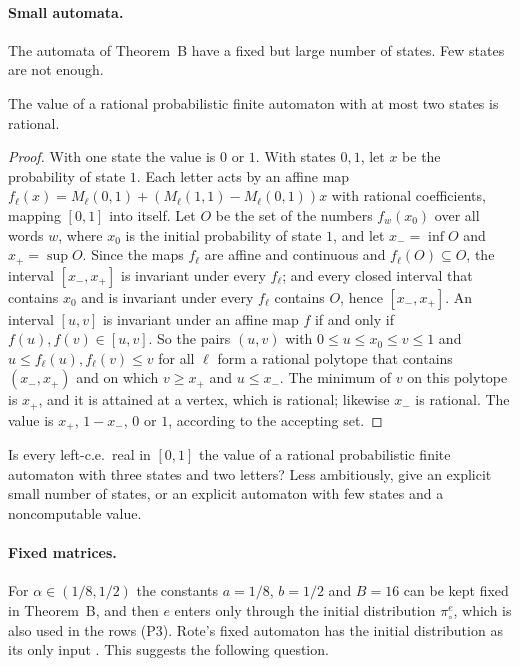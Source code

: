 \documentclass[11pt]{article}
\theoremstyle{plain}
\theoremstyle{definition}
\theoremstyle{remark}
\begin{document}
\paragraph{Small automata.} The automata of Theorem~B have a fixed but large number of states. Few states are not enough.

\begin{proposition}\label{prop:two}
The value of a rational probabilistic finite automaton with at most two states is rational.
\end{proposition}

\begin{proof}
With one state the value is $0$ or $1$. With states $0,1$, let $x$ be the probability of state $1$. Each letter acts by an affine map $f_\ell(x)=M_\ell(0,1)+(M_\ell(1,1)-M_\ell(0,1))x$ with rational coefficients, mapping $[0,1]$ into itself. Let $O$ be the set of the numbers $f_w(x_0)$ over all words $w$, where $x_0$ is the initial probability of state $1$, and let $x_-=\inf O$ and $x_+=\sup O$. Since the maps $f_\ell$ are affine and continuous and $f_\ell(O)\subseteq O$, the interval $[x_-,x_+]$ is invariant under every $f_\ell$; and every closed interval that contains $x_0$ and is invariant under every $f_\ell$ contains $O$, hence $[x_-,x_+]$. An interval $[u,v]$ is invariant under an affine map $f$ if and only if $f(u),f(v)\in[u,v]$. So the pairs $(u,v)$ with $0\le u\le x_0\le v\le1$ and $u\le f_\ell(u),f_\ell(v)\le v$ for all $\ell$ form a rational polytope that contains $(x_-,x_+)$ and on which $v\ge x_+$ and $u\le x_-$. The minimum of $v$ on this polytope is $x_+$, and it is attained at a vertex, which is rational; likewise $x_-$ is rational. The value is $x_+$, $1-x_-$, $0$ or $1$, according to the accepting set.
\end{proof}

\begin{question}
Is every left-c.e.\ real in $[0,1]$ the value of a rational probabilistic finite automaton with three states and two letters? Less ambitiously, give an explicit small number of states, or an explicit automaton with few states and a noncomputable value.
\end{question}

\paragraph{Fixed matrices.} For $\alpha\in(1/8,1/2)$ the constants $a=1/8$, $b=1/2$ and $B=16$ can be kept fixed in Theorem~B, and then $e$ enters only through the initial distribution $\pi^e_\circ$, which is also used in the rows (P3). Rote's fixed automaton has the initial distribution as its only input \cite{Rot25}. This suggests the following question.
\end{document}
